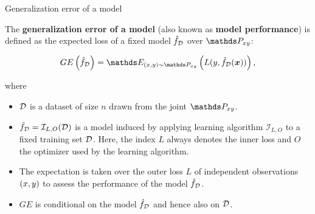 \begin{vbframe}{Generalization error of a model}

The \textbf{generalization error of a model} (also known as \textbf{model performance}) is defined as the expected loss of a fixed model $\hat{f}_{\mathcal{D}}$ over $\Pxy$:

$$
GE\left(\fhD\right) = \E_{\xy \sim \Pxy}\left( L(y, \fhD(\xv))\right),
$$

where

\begin{itemize}
\item $\mathcal{D}$ is a dataset of size $n$ drawn from the joint $\Pxy$.
\item $\hat{f}_{\mathcal{D}} = \mathcal{I}_{L, O}(\mathcal{D})$ is a model induced by applying learning algorithm $\mathcal{I}_{L, O}$ to a fixed training set $\mathcal{D}$. Here, the index $L$ always denotes the inner loss and $O$ the optimizer used by the learning algorithm.
\item The expectation is taken over the outer loss $L$ of independent observations $(x, y)$ to assess the performance of the model $\hat{f}_{\mathcal{D}}$.
\item $GE$ is conditional on the model $\hat{f}_{\mathcal{D}}$ and hence also on $\mathcal{D}$. %
\end{itemize}
\end{vbframe}


